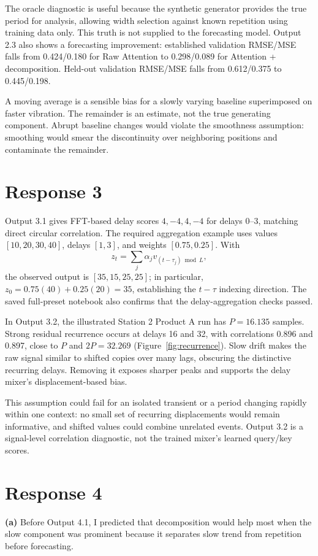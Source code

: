 \documentclass[11pt,a4paper]{article}
\begin{document}
The oracle diagnostic is useful because the synthetic generator provides the true period for analysis, allowing width selection against known repetition using training data only. This truth is not supplied to the forecasting model. Output 2.3 also shows a forecasting improvement: established validation RMSE/MSE falls from 0.424/0.180 for Raw Attention to 0.298/0.089 for Attention + decomposition. Held-out validation RMSE/MSE falls from 0.612/0.375 to 0.445/0.198.

A moving average is a sensible bias for a slowly varying baseline superimposed on faster vibration. The remainder is an estimate, not the true generating component. Abrupt baseline changes would violate the smoothness assumption: smoothing would smear the discontinuity over neighboring positions and contaminate the remainder.

\section*{Response 3}
Output 3.1 gives FFT-based delay scores $4,-4,4,-4$ for delays 0--3, matching direct circular correlation. The required aggregation example uses values $[10,20,30,40]$, delays $[1,3]$, and weights $[0.75,0.25]$. With
\[
 z_t=\sum_j\alpha_jv_{(t-\tau_j)\bmod L},
\]
the observed output is $[35,15,25,25]$; in particular, $z_0=0.75(40)+0.25(20)=35$, establishing the $t-\tau$ indexing direction.
The saved full-preset notebook also confirms that the delay-aggregation checks passed.

In Output 3.2, the illustrated Station 2 Product A run has $P=16.135$ samples. Strong residual recurrence occurs at delays 16 and 32, with correlations 0.896 and 0.897, close to $P$ and $2P=32.269$ (Figure~\ref{fig:recurrence}). Slow drift makes the raw signal similar to shifted copies over many lags, obscuring the distinctive recurring delays. Removing it exposes sharper peaks and supports the delay mixer's displacement-based bias.

This assumption could fail for an isolated transient or a period changing rapidly within one context: no small set of recurring displacements would remain informative, and shifted values could combine unrelated events. Output 3.2 is a signal-level correlation diagnostic, not the trained mixer's learned query/key scores.

\section*{Response 4}
\textbf{(a)} Before Output 4.1, I predicted that decomposition would help most when the slow component was prominent because it separates slow trend from repetition before forecasting.
\end{document}
